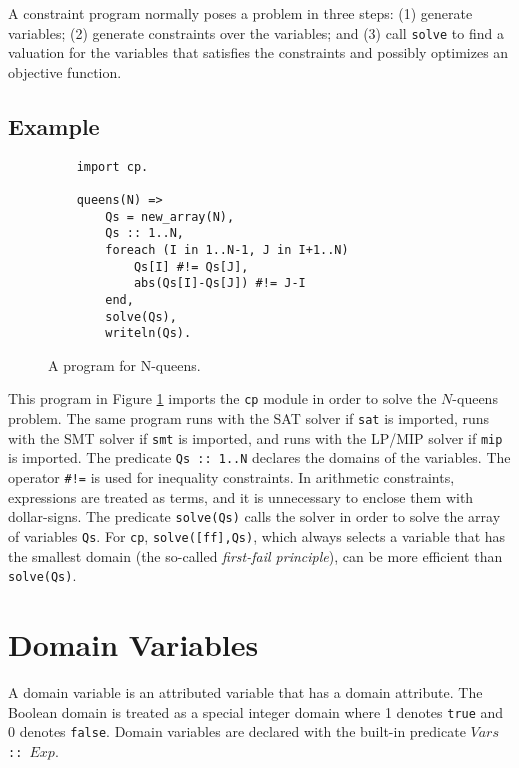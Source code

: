 A constraint program normally poses a problem in three steps: (1) generate variables; (2) generate constraints over the variables; and (3) call \texttt{solve} to find a valuation for the variables that satisfies the constraints and possibly optimizes an objective function.

\subsection*{Example}
\begin{figure}[ht]
\begin{center}
\begin{verbatim}
    import cp.

    queens(N) =>
        Qs = new_array(N),
        Qs :: 1..N,
        foreach (I in 1..N-1, J in I+1..N)
            Qs[I] #!= Qs[J],
            abs(Qs[I]-Qs[J]) #!= J-I
        end,
        solve(Qs),
        writeln(Qs).
\end{verbatim}
\end{center}
\caption{\label{fig:nqueens} A program for N-queens.}
\end{figure}

This program in Figure \ref{fig:nqueens} imports the \texttt{cp} module in order to solve the $N$-queens problem. The same program runs with the SAT solver if \texttt{sat} is imported, runs with the SMT solver if \texttt{smt} is imported, and runs with the LP/MIP solver if \texttt{mip} is imported. The predicate \texttt{Qs :: 1..N} declares the domains of the variables. The operator \verb+#!=+ is used for inequality constraints. In arithmetic constraints, expressions are treated as terms, and it is unnecessary to enclose them with dollar-signs. The predicate \texttt{solve(Qs)} calls the solver in order to solve the array of variables \texttt{Qs}. For \texttt{cp}, \texttt{solve([ff],Qs)}, which always selects a variable that has the smallest domain (the so-called \emph{first-fail principle}), can be more efficient than \texttt{solve(Qs)}.


\section{Domain Variables}
A domain variable is an attributed variable that has a domain attribute. The Boolean domain is treated as a special integer domain where 1 denotes \texttt{true} and 0 denotes \texttt{false}. Domain variables are declared with the built-in predicate \texttt{$Vars$ :: $Exp$}. 


